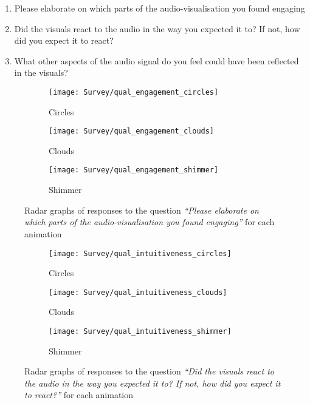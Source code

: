 \documentclass[../initial_thesis.tex]{subfiles}
\begin{document}
\begin{enumerate}
\item {Please elaborate on which parts of the audio-visualisation you found engaging}
\item {Did the visuals react to the audio in the way you expected it to? If not, how did you expect it to react?}
\item {What other aspects of the audio signal do you feel could have been reflected in the visuals?}
\end{enumerate}

\begin{figure}
  \begin{subfigure}{0.5\textwidth}
    \centering
    \texttt{[image: Survey/qual\_engagement\_circles]}
    \caption{Circles}
    \label{fig:engagement_circles}
  \end{subfigure}
  \begin{subfigure}{0.5\textwidth}
    \centering
    \texttt{[image: Survey/qual\_engagement\_clouds]}
    \caption{Clouds}
    \label{fig:engagement_clouds}
  \end{subfigure}
  \begin{subfigure}{0.5\textwidth}
    \centering
    \texttt{[image: Survey/qual\_engagement\_shimmer]}
    \caption{Shimmer}
    \label{fig:engagement_shimmer}
  \end{subfigure}
  \caption{Radar graphs of responses to the question \textit{``Please elaborate on which parts of the audio-visualisation you found engaging''} for each animation}
  \label{fig:engagement_radar}
\end{figure}

\begin{figure}
  \begin{subfigure}{0.5\textwidth}
    \centering
    \texttt{[image: Survey/qual\_intuitiveness\_circles]}
    \caption{Circles}
    \label{fig:intuitiveness_circles}
  \end{subfigure}
  \begin{subfigure}{0.5\textwidth}
    \centering
    \texttt{[image: Survey/qual\_intuitiveness\_clouds]}
    \caption{Clouds}
    \label{fig:intuitiveness_clouds}
  \end{subfigure}
  \begin{subfigure}{0.5\textwidth}
    \centering
    \texttt{[image: Survey/qual\_intuitiveness\_shimmer]}
    \caption{Shimmer}
    \label{fig:intuitiveness_shimmer}
  \end{subfigure}
  \caption{Radar graphs of responses to the question \textit{``Did the visuals react to the audio in the way you expected it to? If not, how did you expect it to react?''} for each animation}
  \label{fig:intuitiveness_radar}
\end{figure}
\end{document}
